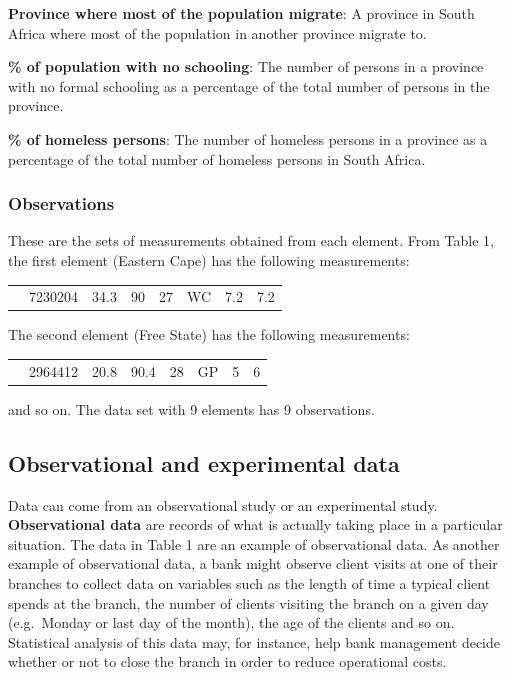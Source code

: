 \documentclass[
]{book}
\begin{document}
\textbf{Province where most of the population migrate}: A province in South Africa where most of the population in another province migrate to.

\textbf{\% of population with no schooling}: The number of persons in a province with no formal schooling as a percentage of the total number of persons in the province.

\textbf{\% of homeless persons}: The number of homeless persons in a province as a percentage of the total number of homeless persons in South Africa.

\subsubsection{Observations}\label{observations}

These are the sets of measurements obtained from each element. From Table 1, the first element (Eastern Cape) has the following measurements:

\begin{longtable}[]{@{}llllllll@{}}
\toprule\noalign{}
\endhead
\bottomrule\noalign{}
\endlastfoot
1 & 7230204 & 34.3 & 90 & 27 & WC & 7.2 & 7.2 \\
\end{longtable}

The second element (Free State) has the following measurements:

\begin{longtable}[]{@{}llllllll@{}}
\toprule\noalign{}
\endhead
\bottomrule\noalign{}
\endlastfoot
2 & 2964412 & 20.8 & 90.4 & 28 & GP & 5 & 6 \\
\end{longtable}

and so on. The data set with 9 elements has 9 observations.

\subsection{Observational and experimental data}\label{observational-and-experimental-data}

Data can come from an observational study or an experimental study. \textbf{Observational data} are records of what is actually taking place in a particular situation. The data in Table 1 are an example of observational data. As another example of observational data, a bank might observe client visits at one of their branches to collect data on variables such as the length of time a typical client spends at the branch, the number of clients visiting the branch on a given day (e.g.~Monday or last day of the month), the age of the clients and so on. Statistical analysis of this data may, for instance, help bank management decide whether or not to close the branch in order to reduce operational costs.
\end{document}

